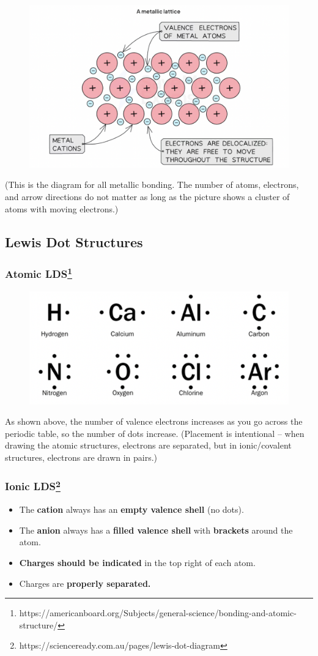 \documentclass[a4paper, 12pt]{article}
\begin{document}
\begin{figure}[ht]
    \centering
    \includegraphics[width=0.5\linewidth]{metalliclattice.png}
    \label{fig:1.3?}
\end{figure}
\noindent (This is the diagram for all metallic bonding. The number of atoms, electrons, and arrow directions do not matter as long as the picture shows a cluster of atoms with moving electrons.)

\subsection*{Lewis Dot Structures}

\subsubsection*{Atomic LDS\footnote{https://americanboard.org/Subjects/general-science/bonding-and-atomic-structure/}
}

\begin{figure}[htbp] 
    \centering
    \includegraphics[width=0.5\linewidth]{atomiclds.png}
    \label{fig:2}
\end{figure} 
\noindent As shown above, the number of valence electrons increases as you go across the periodic table, so the number of dots increase. (Placement is intentional -- when drawing the atomic structures, electrons are separated, but in ionic/covalent structures, electrons are drawn in pairs.)

\subsubsection*{Ionic LDS\footnote{https://scienceready.com.au/pages/lewis-dot-diagram}}
\begin{itemize}[leftmargin=*,nosep]
    \item The \textbf{cation} always has an \textbf{empty valence shell} (no dots).
    \item The \textbf{anion} always has a \textbf{filled valence shell} with \textbf{brackets} around the atom.
    \item \textbf{Charges should be indicated} in the top right of each atom.
    \item Charges are \textbf{properly separated.}
\end{itemize}
\end{document}

